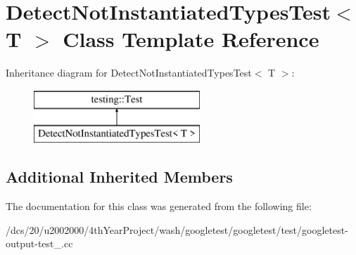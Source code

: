 \hypertarget{classDetectNotInstantiatedTypesTest}{}\section{Detect\+Not\+Instantiated\+Types\+Test$<$ T $>$ Class Template Reference}
\label{classDetectNotInstantiatedTypesTest}
Inheritance diagram for Detect\+Not\+Instantiated\+Types\+Test$<$ T $>$\+:\begin{figure}[H]
\begin{center}
\leavevmode
\includegraphics[height=2.000000cm]{classDetectNotInstantiatedTypesTest}
\end{center}
\end{figure}
\subsection*{Additional Inherited Members}


The documentation for this class was generated from the following file\+:\begin{DoxyCompactItemize}
\item 
/dcs/20/u2002000/4th\+Year\+Project/wash/googletest/googletest/test/googletest-\/output-\/test\+\_\+.\+cc\end{DoxyCompactItemize}
